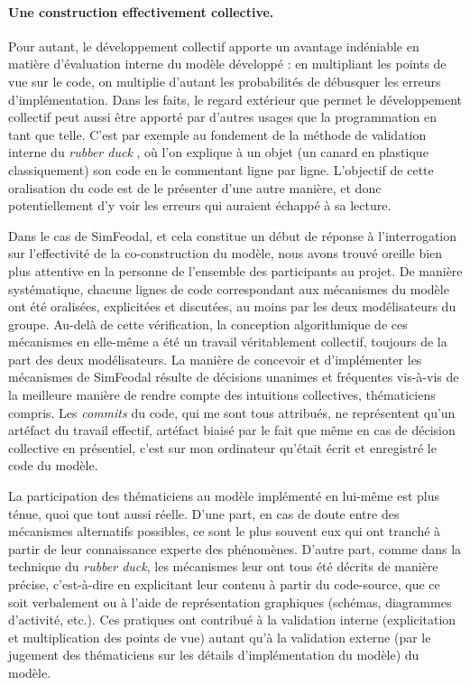 \paragraph{Une construction effectivement collective.}
Pour autant, le développement collectif apporte un avantage indéniable en matière d'évaluation interne du modèle développé : en multipliant les points de vue sur le code, on multiplie d'autant les probabilités de débusquer les erreurs d'implémentation.
Dans les faits, le regard extérieur que permet le développement collectif peut aussi être apporté par d'autres usages que la programmation en tant que telle.
C'est par exemple au fondement de la méthode de validation interne du \og \textit{rubber duck}\fg{} \autocite{noauthor_methode_2019}, où l'on explique à un objet (un \og canard en plastique\fg{} classiquement) son code en le commentant ligne par ligne.
L'objectif de cette oralisation du code est de le présenter d'une autre manière, et donc potentiellement d'y voir les erreurs qui auraient échappé à sa \og lecture\fg{}.

Dans le cas de SimFeodal, et cela constitue un début de réponse à l'interrogation sur l'effectivité de la co-construction du modèle, nous avons trouvé oreille bien plus attentive en la personne de l'ensemble des participants au projet.
De manière systématique, chacune lignes de code correspondant aux mécanismes du modèle ont été oralisées, explicitées et discutées, au moins par les deux \og modélisateurs\fg{} du groupe.
Au-delà de cette vérification, la conception algorithmique de ces mécanismes en elle-même a été un travail véritablement collectif, toujours de la part des deux modélisateurs.
La manière de concevoir et d'implémenter les mécanismes de SimFeodal résulte de décisions unanimes et fréquentes vis-à-vis de la meilleure manière de rendre compte des intuitions collectives, thématiciens compris.
Les \textit{commits} du code, qui me sont tous attribués, ne représentent qu'un artéfact du travail effectif, artéfact biaisé par le fait que même en cas de décision collective en présentiel, c'est sur mon ordinateur qu'était écrit et enregistré le code du modèle.

La participation des thématiciens au modèle implémenté en lui-même est plus ténue, quoi que tout aussi réelle.
D'une part, en cas de doute entre des mécanismes alternatifs possibles, ce sont le plus souvent eux qui ont tranché à partir de leur connaissance experte des phénomènes.
D'autre part, comme dans la technique du \textit{rubber duck}, les mécanismes leur ont tous été décrits de manière précise, c'est-à-dire en explicitant leur contenu à partir du code-source, que ce soit verbalement ou à l'aide de représentation graphiques (schémas, diagrammes d'activité, etc.).
Ces pratiques ont contribué à la validation interne (explicitation et multiplication des points de vue) autant qu'à la validation externe (par le jugement des thématiciens sur les détails d'implémentation du modèle) du modèle.


